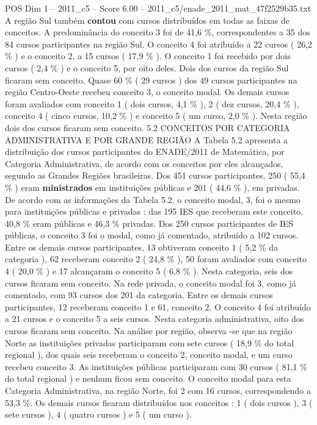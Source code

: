 \begin{textsample}{POS Dim 1 – 2011\_c5 – Score 6.00 – 2011\_c5/enade\_2011\_mat\_47f2529b35.txt}
A região Sul também \textbf{contou} com cursos distribuídos em todas as faixas de conceitos.
A predominância do conceito 3 foi de 41,6 \%, correspondentes a 35 dos 84 cursos participantes na região Sul.
O conceito 4 foi atribuído a 22 cursos ( 26,2 \% ) e o conceito 2, a 15 cursos ( 17,9 \% ).
O conceito 1 foi recebido por dois cursos ( 2,4 \% ) e o conceito 5, por oito deles.
Dois dos cursos da região Sul ficaram sem conceito.
Quase 60 \% ( 29 cursos ) dos 49 cursos participantes na região Centro-Oeste recebeu conceito 3, o conceito modal.
Os demais cursos foram avaliados com conceito 1 ( dois cursos, 4,1 \% ), 2 ( dez cursos, 20,4 \% ), conceito 4 ( cinco cursos, 10,2 \% ) e conceito 5 ( um curso, 2,0 \% ).
Nesta região dois dos cursos ficaram sem conceito. 5.2 CONCEITOS POR CATEGORIA ADMINISTRATIVA E POR GRANDE REGIÃO A Tabela 5.2 apresenta a distribuição dos cursos participantes do ENADE/2011 de Matemática, por Categoria Administrativa, de acordo com os conceitos por eles alcançados, segundo as Grandes Regiões brasileiras.
Dos 451 cursos participantes, 250 ( 55,4 \% ) eram \textbf{ministrados} em instituições públicas e 201 ( 44,6 \% ), em privadas.
De acordo com as informações da Tabela 5.2, o conceito modal, 3, foi o mesmo para instituições públicas e privadas : das 195 IES que receberam este conceito, 40,8 \% eram públicas e 46,3 \% privadas.
Dos 250 cursos participantes de IES públicas, o conceito 3 foi o modal, como já comentado, atribuído a 102 cursos.
Entre os demais cursos participantes, 13 obtiveram conceito 1 ( 5,2 \% da categoria ), 62 receberam conceito 2 ( 24,8 \% ), 50 foram avaliados com conceito 4 ( 20,0 \% ) e 17 alcançaram o conceito 5 ( 6,8 \% ).
Nesta categoria, seis dos cursos ficaram sem conceito.
Na rede privada, o conceito modal foi 3, como já comentado, com 93 cursos dos 201 da categoria.
Entre os demais cursos participantes, 12 receberam conceito 1 e 61, conceito 2.
O conceito 4 foi atribuído a 21 cursos e o conceito 5 a seis cursos.
Nesta categoria administrativa, oito dos cursos ficaram sem conceito.
Na análise por região, observa -se que na região Norte as instituições privadas participaram com sete cursos ( 18,9 \% do total regional ), dos quais seis receberam o conceito 2, conceito modal, e um curso recebeu conceito 3.
As instituições públicas participaram com 30 cursos ( 81,1 \% do total regional ) e nenhum ficou sem conceito.
O conceito modal para esta Categoria Administrativa, na região Norte, foi 2 com 16 cursos, correspondendo a 53,3 \%.
Os demais cursos ficaram distribuídos nos conceitos : 1 ( dois cursos ), 3 ( sete cursos ), 4 ( quatro cursos ) e 5 ( um curso ).

\end{textsample}
